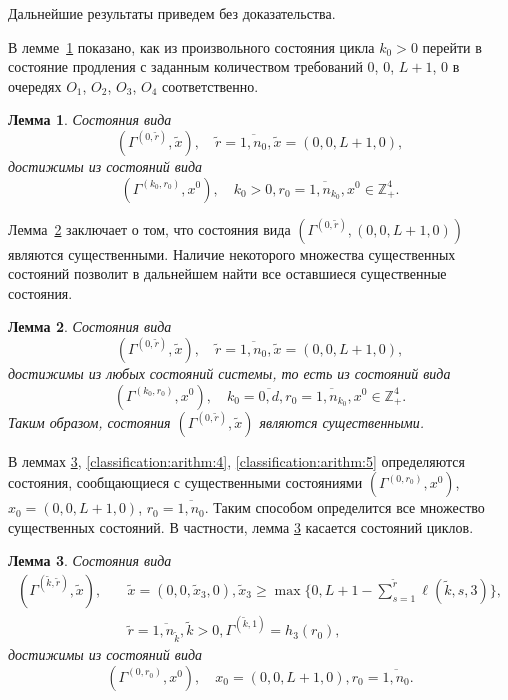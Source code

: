 \documentclass[12pt]{book}
\theoremstyle{plain}
\newtheorem{lemma}{\indent Лемма}
\theoremstyle{remark}
\theoremstyle{plain}
\theoremstyle{definition}
\begin{document}
Дальнейшие результаты приведем без доказательства.

В лемме~\ref{classification:arithm:2} показано,  как из произвольного состояния цикла $k_0 > 0$ перейти в состояние продления с заданным количеством требований $0$,  $0$,  $L+1$,  $0$  в очередях $O_1$,  $O_2$,  $O_3$,  $O_4$ соответственно.
\begin{lemma}\label{classification:arithm:2}
Состояния вида 
$$(\Gamma^{(0,  \tilde{r})},  \tilde{x}),  \quad \tilde{r} = \overline{1,  n_0},  \tilde{x}=(0,  0,  L+1,  0), $$
 достижимы из состояний вида 
 \begin{equation*}
 (\Gamma^{(k_0,  r_0)},  x^0),  \quad k_0 > 0,  r_0=\overline{1,  n_{k_0}},  x^0 \in \mathbb{Z}_+^4.
 \end{equation*}
\end{lemma}
Лемма~\ref{first:lemma} заключает о том,  что состояния вида $(\Gamma^{(0, \tilde{r})}, (0, 0, L+1, 0) )$ являются существенными. Наличие некоторого множества существенных состояний позволит в дальнейшем найти все оставшиеся существенные состояния.
\begin{lemma}\label{first:lemma}
Состояния вида 
$$(\Gamma^{(0,  \tilde{r})},  \tilde{x}),  \quad \tilde{r} = \overline{1,  n_0},  \tilde{x}=(0,  0,  L+1,  0), $$
достижимы из любых состояний системы,  то есть из состояний вида 
 $$(\Gamma^{(k_0,  r_0)},  x^0),  \quad k_0=\overline{0,  d},  r_0=\overline{1,  n_{k_0}},  x^0 \in \mathbb{Z}_+^4.$$
Таким образом,  состояния $(\Gamma^{(0,  \tilde{r})},  \tilde{x})$ являются существенными.
\end{lemma}



В леммах \ref{classification:arithm:3},  \ref{classification:arithm:4},  \ref{classification:arithm:5} определяются состояния,  сообщающиеся с существенными состояниями $(\Gamma^{(0,  r_0)},  x^0)$,  $x_0=(0,  0,  L+1,  0)$,  $r_0=\overline{1,  n_0}$. Таким способом определится все множество существенных состояний. В частности,  лемма \ref{classification:arithm:3} касается состояний циклов.
\begin{lemma}\label{classification:arithm:3}
Состояния вида 
\begin{align*}
    (\Gamma^{(\tilde{k},  \tilde{r})},  \tilde{x}),  \quad
&\tilde{x}=(0,  0,  \tilde{x}_3,  0),  \tilde{x}_3\geqslant\max{\{0,  L+1-\sum_{s=1}^{\tilde{r}} \ell(\tilde{k},  s,  3)\}},  \\ &\tilde{r} = \overline{1,  n_{\tilde{k}}},  \tilde{k}>0,  \Gamma^{(\tilde{k},  1)}=h_3(r_0), 
\end{align*}
 достижимы из состояний вида
 $$(\Gamma^{(0,  r_0)},  x^0),  \quad x_0=(0,  0,  L+1,  0),  r_0=\overline{1,  n_0}.$$
\end{lemma}
\end{document}
